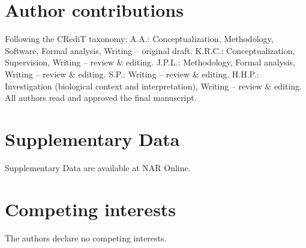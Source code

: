 \documentclass[unnumsec,webpdf,contemporary,large]{oup-authoring-template}
\begin{document}
\section*{Author contributions}
Following the CRediT taxonomy:
A.A.: Conceptualization, Methodology, Software, Formal analysis, Writing -- original draft.
K.R.C.: Conceptualization, Supervision, Writing -- review \& editing.
J.P.L.: Methodology, Formal analysis, Writing -- review \& editing.
S.P.: Writing -- review \& editing.
H.H.P.: Investigation (biological context and interpretation), Writing -- review \& editing.
All authors read and approved the final manuscript.

\section*{Supplementary Data}
Supplementary Data are available at NAR Online.

\section*{Competing interests}
The authors declare no competing interests.



\end{document}
